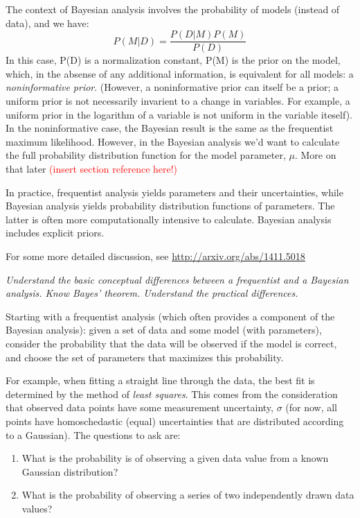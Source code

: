 \documentclass{article}
\newcommand{\test}[1]{%
    \begin{center}
        \colorbox{hl}{\parbox{0.9\textwidth}{\emph{\centering #1}}}
    \end{center}}
\begin{document}
The context of Bayesian analysis involves the probability of models
(instead of data), and we have:
    $$ P(M|D) = \frac{P(D|M)P(M)}{P(D)} $$
In this case, P(D) is a normalization constant, P(M) is the prior on the
model, which, in the absense of any additional information, is equivalent
for all models: a \emph{noninformative prior}. (However, a noninformative
prior can itself be a prior; a uniform prior is not necessarily invarient
to a change in variables. For example, a uniform prior in the logarithm
of a variable is not uniform in the variable iteself).
In the noninformative case, the Bayesian
result is the same as the frequentist maximum likelihood. However, in the
Bayesian analysis we'd want to calculate the full probability distribution
function for the model parameter, $\mu$. More on that later
\textcolor{red}{(insert section reference here!)}

In practice, frequentist analysis yields parameters and their
uncertainties, while Bayesian analysis yields probability distribution
functions of parameters. The latter is often more computationally
intensive to calculate. Bayesian analysis includes explicit priors.

For some more detailed discussion, see
\url{http://arxiv.org/abs/1411.5018}

\test{Understand the basic conceptual differences between a frequentist
and a Bayesian analysis. Know Bayes' theorem. Understand the practical
differences.}

Starting with a frequentist analysis (which often provides a component of
the Bayesian analysis): given a set of data and some model (with
parameters), consider the probability that the data will be observed if the
model is correct, and choose the set of parameters that maximizes this
probability.

For example, when fitting a straight line through the data, the best fit is
determined by the method of \emph{least squares}. This comes from the
consideration that
observed data points have some measurement uncertainty,
$\sigma$ (for now, all points have homoschedastic (equal) uncertainties
that are distributed according to a Gaussian). The questions to ask are:

\begin{enumerate}
    \item What is the probability is of observing a given data value from a
        known Gaussian distribution?
    \item What is the probability of observing a
        series of two independently drawn data values?
\end{enumerate}
\end{document}
